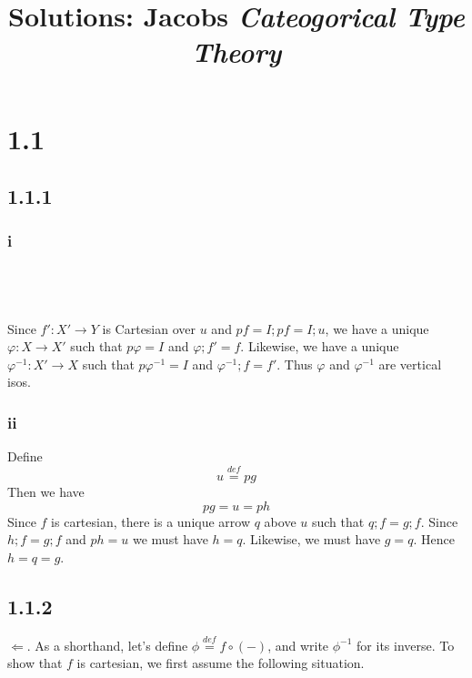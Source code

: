\documentclass{article}
\title{Solutions: Jacobs \emph{Cateogorical Type Theory} }
\newcommand{\defeq}{\overset{\mathit{def}}{=}}
\begin{document}
\maketitle

\section*{1.1}

\subsection*{1.1.1}

\subsubsection*{i}
\\~\\~\\
Since $f' : X' \to Y$ is Cartesian over $u$ and $pf = I;pf = I;u$, we have a
unique $\varphi : X \to X'$ such that $p \varphi = I$ and $\varphi;f' = f$.
Likewise, we have a unique $\varphi^{-1} : X' \to X$ such that $p \varphi^{-1} = I$ 
and $\varphi^{-1};f = f'$. Thus $\varphi$ and $\varphi^{-1}$ are vertical isos.

\subsubsection*{ii} 

Define $$u \defeq pg$$ Then we have $$pg = u = ph$$ Since $f$ is cartesian, there is a unique arrow $q$ above $u$ such that
$q;f = g;f$. Since $h;f = g;f$ and $ph = u$ we must have $h = q$. Likewise, we must have $g = q$. Hence $h = q = g$. 

\subsection*{1.1.2}
 
$\Leftarrow$. As a shorthand, let's define $\phi \defeq f \circ (-)$, and write $\phi^{-1}$ for its inverse.
To show that $f$ is cartesian, we first assume the following situation.
\end{document}
